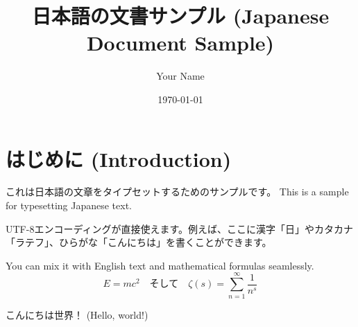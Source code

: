 \documentclass[lualatex]{bxjsarticle}
\title{日本語の文書サンプル (Japanese Document Sample)}
\author{Your Name}
\date{\today}
\begin{document}
\maketitle

\section{はじめに (Introduction)}

これは日本語の文章をタイプセットするためのサンプルです。
This is a sample for typesetting Japanese text.

UTF-8エンコーディングが直接使えます。例えば、ここに漢字「日」やカタカナ「ラテフ」、ひらがな「こんにちは」を書くことができます。

You can mix it with English text and mathematical formulas seamlessly.
\[
    E = mc^2 \quad \text{そして} \quad \zeta(s) = \sum_{n=1}^{\infty} \frac{1}{n^s}
\]

こんにちは世界！ (Hello, world!)
\end{document}

